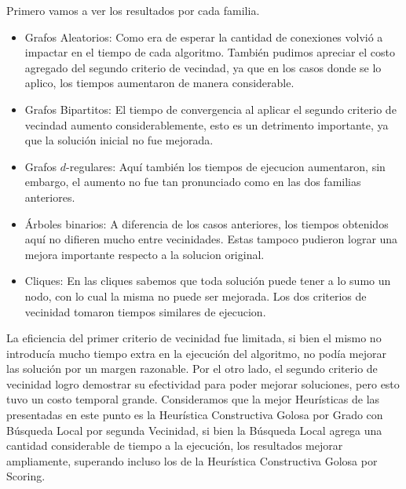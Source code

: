 Primero vamos a ver los resultados por cada familia.

\begin{itemize}
	\item Grafos Aleatorios: Como era de esperar la cantidad de conexiones volvió a impactar en el tiempo de cada algoritmo. También pudimos apreciar el costo agregado del segundo criterio de vecindad, ya que en los casos donde se lo aplico, los tiempos aumentaron de manera considerable.
	\item Grafos Bipartitos: El tiempo de convergencia al aplicar el segundo criterio de vecindad aumento considerablemente, esto es un detrimento importante, ya que la solución inicial no fue mejorada.
	\item Grafos $d$-regulares: Aquí también los tiempos de ejecucion aumentaron, sin embargo, el aumento no fue tan pronunciado como en las dos familias anteriores.
	\item Árboles binarios: A diferencia de los casos anteriores, los tiempos obtenidos aquí no difieren mucho entre vecinidades. Estas tampoco pudieron lograr una mejora importante respecto a la solucion original.
	\item Cliques: En las cliques sabemos que toda solución puede tener a lo sumo un nodo, con lo cual la misma no puede ser mejorada. Los dos criterios de vecinidad tomaron tiempos similares de ejecucion.
\end{itemize}

La eficiencia del primer criterio de vecinidad fue limitada, si bien el mismo no introducía mucho tiempo extra en la ejecución del algoritmo, no podía mejorar las solución por un margen razonable. Por el otro lado, el segundo criterio de vecinidad logro demostrar su efectividad para poder mejorar soluciones, pero esto tuvo un costo temporal grande. Consideramos que la mejor Heurísticas de las presentadas en este punto es la Heurística Constructiva Golosa por Grado con Búsqueda Local por segunda Vecinidad, si bien la Búsqueda Local agrega una cantidad considerable de tiempo a la ejecución, los resultados mejorar ampliamente, superando incluso los de la Heurística Constructiva Golosa por Scoring.